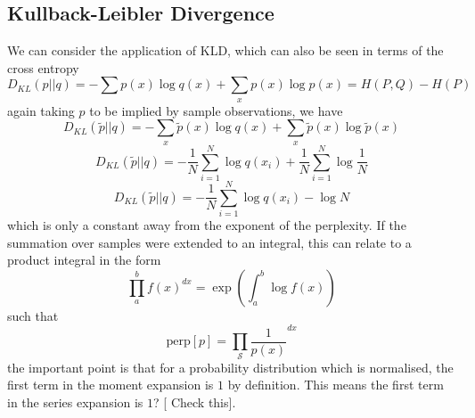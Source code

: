 \documentclass[journal=jcisd8,manuscript=article,layout=onecolumn,pdftex,floatfix,amsmath,amssymb,10pt]{achemso}
\begin{document}
\subsection{Kullback-Leibler Divergence}
We can consider the application of KLD, which can also be seen in terms of the cross entropy
\begin{equation}
D_{KL}(p||q) = - \sum p(x) \log q(x)  + \sum_{x} p(x) \log p(x) = H(P,Q)- H(P)
\end{equation}
again taking $p$ to be implied by sample observations, we have
\begin{equation}
D_{KL}(\tilde{p}||q) = - \sum_x \tilde{p}(x) \log q(x)  + \sum_{x} \tilde{p}(x) \log \tilde{p}(x)
\end{equation}
\begin{equation}
D_{KL}(\tilde{p}||q) = - \frac{1}{N}\sum_{i=1}^N \log q(x_i)  + \frac{1}{N} \sum_{i=1}^N \log \frac{1}{N}
\end{equation}
\begin{equation}
D_{KL}(\tilde{p}||q) = - \frac{1}{N}\sum_{i=1}^N \log q(x_i)  -\log N
\end{equation}
which is only a constant away from the exponent of the perplexity. If the summation over samples were extended to an integral, this can relate to a product integral in the form
\begin{equation}
\prod_a^b f(x) ^{dx} = \exp\left(\int_a^b \log f(x) \right)
\end{equation}
such that 
\begin{equation}
\mathrm{perp}[p] = \prod_{\mathcal{S}} \frac{1}{p(x)} ^{dx}
\end{equation}
the important point is that for a probability distribution which is normalised, the first term in the moment expansion is $1$ by definition. This means the first term in the series expansion is $1$? [{\color{red} Check this}].
\end{document}
